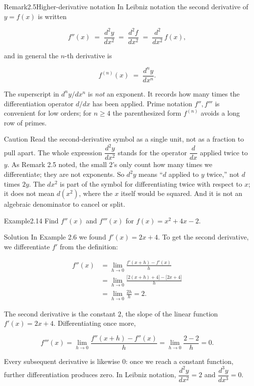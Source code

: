 \documentclass[a4paper,12pt,oneside]{memoir}
\begin{document}
\begin{envremark}{Remark}{2.5}{Higher-derivative notation}
In Leibniz notation the second derivative of \(y = f(x)\) is written

\[ f''(x) \;=\; \frac{d^{2}y}{dx^{2}} \;=\; \frac{d^{2}f}{dx^{2}} \;=\; \frac{d^{2}}{dx^{2}}\,f(x), \]

and in general the \(n\)-th derivative is

\[ f^{(n)}(x) \;=\; \frac{d^{n}y}{dx^{n}}. \]

The superscript in \(d^{n}y/dx^{n}\) is \emph{not} an exponent. It records how many times the differentiation operator \(d/dx\) has been applied. Prime notation \(f'', f'''\) is convenient for low orders; for \(n \ge 4\) the parenthesized form \(f^{(n)}\) avoids a long row of primes.
\end{envremark}
\begin{envcaution}{Caution}{}{}
Read the second-derivative symbol as a single unit, not as a fraction to pull apart. The whole expression \(\dfrac{d^{2}y}{dx^{2}}\) stands for the operator \(\dfrac{d}{dx}\) applied twice to \(y\). As Remark 2.5 noted, the small \(2\)’s only count how many times we differentiate; they are not exponents. So \(d^{2}y\) means “\(d\) applied to \(y\) twice,” not \(d\) times \(2y\). The \(dx^{2}\) is part of the symbol for differentiating twice with respect to \(x\); it does not mean \(d(x^{2})\), where the \(x\) itself would be squared. And it is not an algebraic denominator to cancel or split.
\end{envcaution}
\begin{workedexample}
\begin{envexample}{Example}{2.14}{}
Find \(f''(x)\) and \(f'''(x)\) for \(f(x) = x^{2} + 4x - 2\).
\end{envexample}
\begin{envsolution}{Solution}{}{}
In Example 2.6 we found \(f'(x) = 2x + 4\). To get the second derivative, we differentiate \(f'\) from the definition:

\[ \begin{aligned}
          f''(x) &= \lim_{h \to 0} \frac{f'(x + h) - f'(x)}{h} \\[2pt]
                 &= \lim_{h \to 0} \frac{\bigl[2(x + h) + 4\bigr] - \bigl[2x + 4\bigr]}{h} \\[2pt]
                 &= \lim_{h \to 0} \frac{2h}{h} = 2.
        \end{aligned} \]

The second derivative is the constant \(2\), the slope of the linear function \(f'(x) = 2x + 4\). Differentiating once more,

\[ f'''(x) = \lim_{h \to 0} \frac{f''(x + h) - f''(x)}{h} = \lim_{h \to 0} \frac{2 - 2}{h} = 0. \]

Every subsequent derivative is likewise \(0\): once we reach a constant function, further differentiation produces zero. In Leibniz notation, \(\dfrac{d^{2}y}{dx^{2}} = 2\) and \(\dfrac{d^{3}y}{dx^{3}} = 0\).
\end{envsolution}
\end{workedexample}
\end{document}
